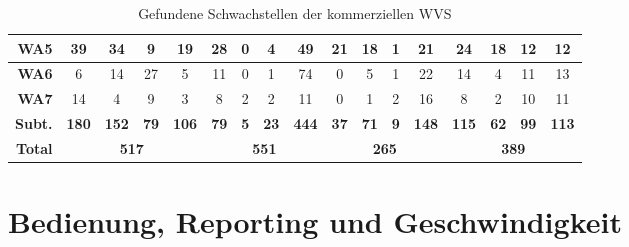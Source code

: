 \documentclass[12pt,oneside,a4paper,parskip]{scrbook}
\begin{document}
\begin{table}[H]
\begin{tabular}{|r|c|c|c|c|c|c|c|c|c|c|c|c|c|c|c|c|}
        \hline
        \textbf{WA5}          & 39           & 34           & 9           & 19           & 28          & 0          & 4           & 49           & 21          & 18          & 1          & 21           & 24           & 18          & 12          & 12            \\
        \hline
        \textbf{WA6}   & 6            & 14           & 27          & 5            & 11          & 0          & 1           & 74           & 0           & 5           & 1          & 22           & 14           & 4           & 11          & 13            \\
        \hline
        \textbf{WA7} & 14           & 4            & 9           & 3            & 8           & 2          & 2           & 11           & 0           & 1           & 2          & 16           & 8            & 2           & 10          & 11            \\
        \hline
        \textbf{Subt.}        & \textbf{180} & \textbf{152} & \textbf{79} & \textbf{106} & \textbf{79} & \textbf{5} & \textbf{23} & \textbf{444} & \textbf{37} & \textbf{71} & \textbf{9} & \textbf{148} & \textbf{115} & \textbf{62} & \textbf{99} & \textbf{113}  \\
        \hline
        \textbf{Total}           & \multicolumn{4}{c|}{\textbf{517}}                        & \multicolumn{4}{c|}{\textbf{551}}                     & \multicolumn{4}{c|}{\textbf{265}}                     & \multicolumn{4}{c|}{\textbf{389}}                        \\
        \hline
      \end{tabular}
      \caption[Gefundene Schwachstellen der kommerziellen WVS]{Gefundene Schwachstellen der kommerziellen WVS}
    \end{table}

  \section{Bedienung, Reporting und Geschwindigkeit}
\end{document}
